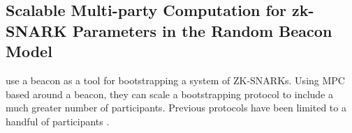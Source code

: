 \subsection{Scalable Multi-party Computation for zk-SNARK Parameters in the Random Beacon Model}
\label{sub:scalable_mpc_zk_snarks}
\citet{mpcsnarks} use a beacon as a tool for bootstrapping a system of \gls{ZK-SNARK}s. Using  \gls{MPC} based around a beacon, they can scale a bootstrapping protocol to include a much greater number of participants. Previous protocols have been limited to a handful of participants \cite{snarkparameters}.  